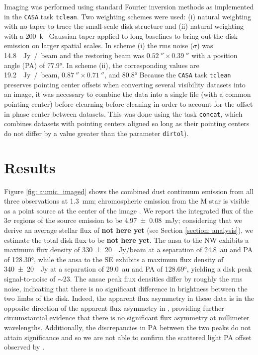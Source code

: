 \documentclass[12pt,oneside]{article}
\begin{document}
Imaging was performed using standard Fourier inversion methods as implemented in the \texttt{CASA} task \texttt{tclean}. 
Two weighting schemes were used: (i) natural weighting with no taper to trace the small-scale disk structure and (ii) natural weighting with a \SI{200}{k\lambda} Gaussian taper applied to long baselines to bring out the disk emission on larger spatial scales. 
In scheme (i) the rms noise ($\sigma$) was \SI{14.8}{\mu Jy / beam} and the restoring beam was $\SI{0.52}{''} \times \SI{0.39}{''}$ with a position angle (PA) of \ang{77.9}. 
In scheme (ii), the corresponding values are \SI{19.2}{\mu Jy / beam}, $\SI{0.87}{''} \times \SI{0.71}{''}$, and \ang{80.8}
Because the \texttt{CASA} task \texttt{tclean} preserves pointing center offsets when converting several visibility datasets into an image, it was necessary to combine the data into a single file (with a common pointing center) before clearning before cleaning in order to account for the offset in phase center between datasets. 
This was done using the task \texttt{concat}, which combines datasets with pointing centers aligned so long as their pointing centers do not differ by a value greater than the parameter \texttt{dirtol}).


\section{Results}
\label{section: results}

Figure \ref{fig: aumic_imaged} shows the combined dust continuum emission from all three observations at \SI{1.3}{mm}; chromospheric emission from the M star is visible as a point source at the center of the image \citep{cranmer13}. 
We report the integrated flux of the $3 \sigma$ regions of the source emission to be \SI{4.97 \pm 0.08}{\milli Jy}; considering that we derive an average stellar flux of \textbf{not here yet} (see Section \ref{section: analysis}), we estimate the total disk flux to be \textbf{not here yet}.
The ansa to the NW exhibits a maximum flux density of \SI{330 \pm 20}{\mu Jy/beam} at a separation of \SI{24.8}{au} and PA of \ang{128.30}, while the ansa to the SE exhibits a maximum flux density of \SI{340 \pm 20}{\mu Jy} at a separation of \SI{29.0}{au} and PA of \ang{128.69}, yielding a disk peak signal-to-noise of $\sim23$. 
The ansae peak flux densities differ by roughly the rms noise, indicating that there is no significant difference in brightness between the two limbs of the disk.
Indeed, the apparent flux asymmetry in these data is in the opposite direction of the apparent flux asymmetry in \cite{macgregor13}, providing further circumstantial evidence that there is no significant flux asymmetry at millimeter wavelengths. 
Additionally, the discrepancies in PA between the two peaks do not attain significance and so we are not able to confirm the scattered light PA offset observed by \cite{boccaletti15}. 
\end{document}
